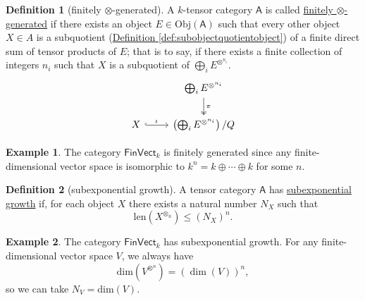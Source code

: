 \documentclass[a4paper,10pt]{scrreprt}
\newcommand{\defn}[1]{\ul{#1}}
\newcommand{\Obj}{\mathrm{Obj}}
\theoremstyle{definition}
\newtheorem{definition}{Definition}[section]
\newtheorem{example}{Example}[section]
\theoremstyle{plain}
\theoremstyle{remark}
\begin{document}
\begin{definition}[finitely $\otimes$-generated]
  \label{def:finitelygenerated}
  A $k$-tensor category $\mathsf{A}$ is called \defn{finitely $\otimes$-generated} if there exists an object $E \in \Obj(\mathsf{A})$ such that every other object $X \in A$ is a subquotient (\hyperref[def:subobjectquotientobject]{Definition \ref*{def:subobjectquotientobject}}) of a finite direct sum of tensor products of $E$; that is to say, if there exists a finite collection of integers $n_{i}$ such that $X$ is a subquotient of $\bigoplus_{i} E^{\otimes^{n_{i}}}$.
  \begin{equation*}
    \begin{tikzcd}
      & \bigoplus_{i} E^{\otimes^{n_{i}}}
      \arrow[d, twoheadrightarrow, "\pi"]
      \\
      X
      \arrow[r, hookrightarrow, "\iota"]
      & \left( \bigoplus_{i} E^{\otimes^{n_{i}}} \right) / Q
    \end{tikzcd}
  \end{equation*}
\end{definition}

\begin{example}
  The category $\mathsf{FinVect}_{k}$ is finitely generated since any finite-dimensional vector space is isomorphic to $k^{n} = k \oplus \cdots \oplus k$ for some $n$.
\end{example}

\begin{definition}[subexponential growth]
  \label{def:subexponentialgrowth}
  A tensor category $\mathsf{A}$ has \defn{subexponential growth} if, for each object $X$ there exists a natural number $N_{X}$ such that 
  \begin{equation*}
    \mathrm{len}(X^{\otimes_{n}}) \leq (N_{X})^{n}.
  \end{equation*}
\end{definition}

\begin{example}
  The category $\mathsf{FinVect}_{k}$ has subexponential growth. For any finite-dimensional vector space $V$, we always have 
  \begin{equation*}
    \mathrm{dim}(V^{\otimes^{n}}) = (\dim(V))^{n},
  \end{equation*}
  so we can take $N_{V} = \mathrm{dim}(V)$.
\end{example}
\end{document}
